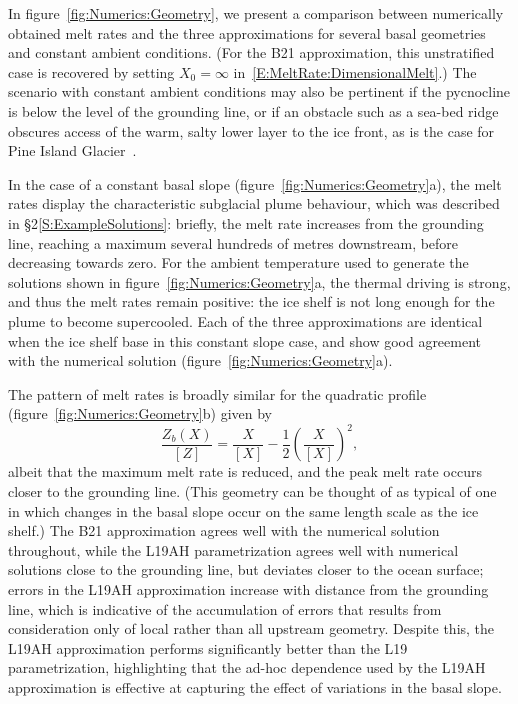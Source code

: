 \documentclass[openacc]{rsproca_new}%
\begin{document}
In figure~\ref{fig:Numerics:Geometry}, we present a comparison between numerically obtained melt rates and the three approximations for several basal geometries and constant ambient conditions. (For the B21 approximation, this unstratified case is recovered by setting $X_0 = \infty$ in~\eqref{E:MeltRate:DimensionalMelt}.) The scenario with constant ambient conditions may also be pertinent if the pycnocline is below the level of the grounding line, or if an obstacle such as a sea-bed ridge obscures access of the warm, salty lower layer to the ice front, as is the case for Pine Island Glacier~\cite{DeRydt2014JGeophysResOceans}. 

In the case of a constant basal slope (figure~\ref{fig:Numerics:Geometry}a), the melt rates display the characteristic subglacial plume behaviour, which was described in \S2\ref{S:ExampleSolutions}: briefly, the melt rate increases from the grounding line, reaching a maximum several hundreds of metres downstream, before decreasing towards zero. For the ambient temperature used to generate the solutions shown in figure~\ref{fig:Numerics:Geometry}a, the thermal driving is strong, and thus the melt rates remain positive: the ice shelf is not long enough for the plume to become supercooled. Each of the three approximations are identical when the ice shelf base in this constant slope case, and show good agreement with the numerical solution (figure~\ref{fig:Numerics:Geometry}a).

The pattern of melt rates is broadly similar for the quadratic profile (figure~\ref{fig:Numerics:Geometry}b) given by
\begin{equation}\label{E:Numerics:QuadraticGeometry}
\frac{Z_b(X)}{\left[Z\right]}= \frac{X}{\left[X\right]} - \frac{1}{2}\left(\frac{X}{\left[X\right]}\right)^2,
\end{equation}
albeit that the maximum melt rate is reduced, and the peak melt rate occurs closer to the grounding line. (This geometry can be thought of as typical of one in which changes in the basal slope occur on the same length scale as the ice shelf.) The B21 approximation agrees well with the numerical solution throughout, while the L19AH parametrization agrees well with numerical solutions close to the grounding line, but deviates closer to the ocean surface; errors in the L19AH approximation increase with distance from the grounding line, which is indicative of the accumulation of errors that results from consideration only of local rather than all upstream geometry. Despite this, the L19AH approximation performs significantly better than the L19 parametrization, highlighting that the ad-hoc dependence used by the L19AH approximation is effective at capturing the effect of variations in the basal slope.
\end{document}
